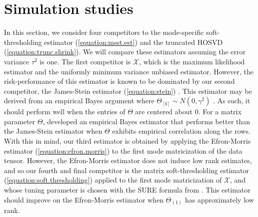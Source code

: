 \section{Simulation studies}
\label{sec:simulation}

In this section, we consider four competitors to the mode-specific
soft-thresholding estimator (\ref{equation:msst.est}) and the
truncated HOSVD (\ref{equation:trunc.shrink}). We will compare these
estimators assuming the error variance $\tau^2$ is one. The first
competitor is $\mathcal{X}$, which is the maximum likelihood estimator
and the uniformly minimum variance unbiased estimator. However, the
risk-performance of this estimator is known to be dominated by our
second competitor, the James-Stein estimator (\ref{equation:stein})
\citep{stein1981estimation}.  This estimator may be derived from an
empirical Bayes argument where $\Theta_{[\mathbf{i}]} \sim
N(0,\gamma^2)$ \citep{efron1972limiting}. As such, it should perform
well when the entries of $\Theta$ are centered about $0$. For a matrix
parameter $\Theta$, \cite{efron1972empirical} developed an empirical
Bayes estimator that performs better than the James-Stein estimator
when $\Theta$ exhibits empirical correlation along the rows. With this
in mind, our third estimator is obtained by applying the Efron-Morris
estimator (\ref{equation:efron.morris}) to the first mode
matricization of the data tensor. However, the Efron-Morris estimator
does not induce low rank estimates, and so our fourth and final
competitor is the matrix soft-thresholding estimator
(\ref{equation:soft.thresholding}) applied to the first mode
matricization of $\mathcal{X}$, and whose tuning parameter is chosen
with the SURE formula from \cite{candes2013unbiased}. This estimator
should improve on the Efron-Morris estimator when $\Theta_{(1)}$ has
approximately low rank.

